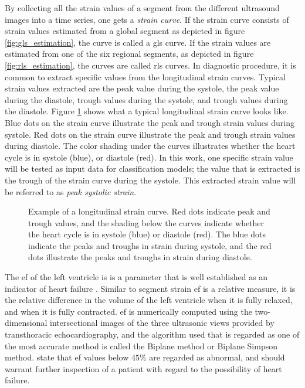 By collecting all the strain values of a segment from the different ultrasound images into a time series, one gets a \textit{strain curve}. If the strain curve consists of strain values estimated from a global segment as depicted in figure \ref{fig:gls_estimation}, the curve is called a \acrfull{gls} curve. If the strain values are estimated from one of the six regional segments, as depicted in figure \ref{fig:rls_estimation}, the curves are called \acrfull{rls} curves. In diagnostic procedure, it is common to extract specific values from the longitudinal strain curves. Typical strain values extracted are the peak value during the systole, the peak value during the diastole, trough values during the systole, and trough values during the diastole. Figure \ref{fig:pss_illustration} shows what a typical longitudinal strain curve looks like. Blue dots on the strain curve illustrate the peak and trough strain values during systole. Red dots on the strain curve illustrate the peak and trough strain values during diastole. The color shading under the curves illustrates whether the heart cycle is in systole (blue), or diastole (red). In this work, one specific strain value will be tested as input data for classification models; the value that is extracted is the trough of the strain curve during the systole. This extracted strain value will be referred to as \textit{peak systolic strain}.

\begin{figure}[H]
    \centering
    
    \caption{Example of a longitudinal strain curve. Red dots indicate peak and trough values, and the shading below the curves indicate whether the heart cycle is in systole (blue) or diastole (red). The blue dots indicate the peaks and troughs in strain during systole, and the red dots illustrate the peaks and troughs in strain during diastole.}
    \label{fig:pss_illustration}
\end{figure}

The \acrfull{ef} of the left ventricle is is a parameter that is well established as an indicator of heart failure \cite{myocardial_imaging}. Similar to segment strain \acrshort{ef} is a relative measure, it is the relative difference in the volume of the left ventricle when it is fully relaxed, and when it is fully contracted. \acrshort{ef} is numerically computed using the two-dimensional intersectional images of the three ultrasonic views provided by transthoracic echocardiography, and the algorithm used that is regarded as one of the most accurate method is called the Biplane method \cite{myocardial_imaging} or Biplane Simpson method.
\cite{myocardial_defomation_analysis} \textcite{myocardial_imaging} state that \acrshort{ef} values below $45\%$ are regarded as abnormal, and should warrant further inspection of a patient with regard to the possibility of heart failure.

